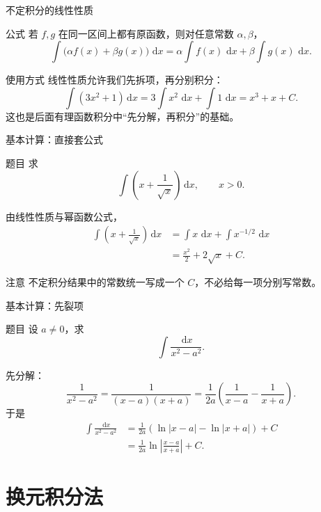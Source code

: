 \documentclass[aspectratio=169,10pt]{ctexbeamer}
\newcommand{\dd}{\,\mathrm{d}}
\begin{document}
\begin{frame}[t]{不定积分的线性性质}
\small
\begin{block}{公式}
若 $f,g$ 在同一区间上都有原函数，则对任意常数 $\alpha,\beta$，
\[
  \int \bigl(\alpha f(x)+\beta g(x)\bigr)\,\dd x
  =\alpha\int f(x)\,\dd x+\beta\int g(x)\,\dd x.
\]
\end{block}

\begin{block}{使用方式}
线性性质允许我们先拆项，再分别积分：
\[
  \int \left(3x^2+1\right)\dd x
  =3\int x^2\,\dd x+\int 1\,\dd x
  =x^3+x+C.
\]
这也是后面有理函数积分中“先分解，再积分”的基础。
\end{block}
\end{frame}

\begin{frame}[t]{基本计算：直接套公式}
\small
\begin{block}{题目}
求
\[
  \int\left(x+\frac1{\sqrt{x}}\right)\dd x,\qquad x>0.
\]
\end{block}

由线性性质与幂函数公式，
\[
\begin{aligned}
\int\left(x+\frac1{\sqrt{x}}\right)\dd x
&=\int x\,\dd x+\int x^{-1/2}\,\dd x\\
&=\frac{x^2}{2}+2\sqrt{x}+C.
\end{aligned}
\]

\begin{alertblock}{注意}
不定积分结果中的常数统一写成一个 $C$，不必给每一项分别写常数。
\end{alertblock}
\end{frame}

\begin{frame}[t]{基本计算：先裂项}
\small
\begin{block}{题目}
设 $a\ne0$，求
\[
  \int\frac{\dd x}{x^2-a^2}.
\]
\end{block}

先分解：
\[
  \frac1{x^2-a^2}
  =\frac1{(x-a)(x+a)}
  =\frac1{2a}\left(\frac1{x-a}-\frac1{x+a}\right).
\]
于是
\[
\begin{aligned}
\int\frac{\dd x}{x^2-a^2}
&=\frac1{2a}\left(\ln|x-a|-\ln|x+a|\right)+C\\
&=\frac1{2a}\ln\left|\frac{x-a}{x+a}\right|+C.
\end{aligned}
\]
\end{frame}

\section{换元积分法}
\end{document}
